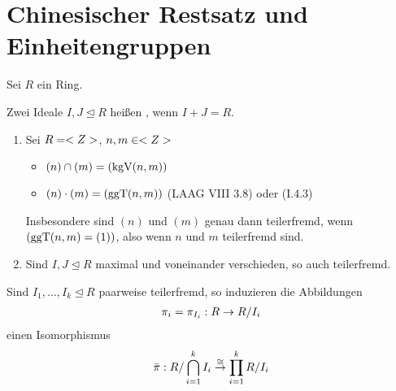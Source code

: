 \section{Chinesischer Restsatz und Einheitengruppen}

Sei $R$ ein Ring.

\begin{definition}[teilerfremd]
	Zwei Ideale $I,J \unlhd R$ heißen , wenn $I+J = R$.
\end{definition}

\begin{example}
	\begin{enumerate}
		\item Sei $R = <Z>$, $n,m \in <Z>$
			\begin{itemize}
				\item $(n) \cap (m) = (\operatorname{kgV}(n,m))$
				\item $(n) \cdot (m) = (\operatorname{ggT}(n,m))$ (LAAG VIII 3.8) oder (I.4.3) %
			\end{itemize}
		Insbesondere sind $(n)$ und $(m)$ genau dann teilerfremd, wenn $(\operatorname{ggT}(n,m) = (1))$, also wenn $n$ und $m$ teilerfremd sind.
		\item Sind $I,J \unlhd R$ maximal und voneinander verschieden, so auch teilerfremd.
	\end{enumerate}
\end{example}

\begin{theorem}
	Sind $I_1, \dots , I_k \unlhd R$ paarweise teilerfremd, so induzieren die Abbildungen
	\begin{align}
		\pi_i = \pi_{I_i} : R \to R/ I_i\notag
	\end{align}
	einen Isomorphismus
	\begin{align}
		\bar{\pi}: R/ \bigcap_{i=1}^{k} I_i \overset{\cong}{\to} \prod_{i=1}^{k} R/I_i \notag
	\end{align}
\end{theorem}

